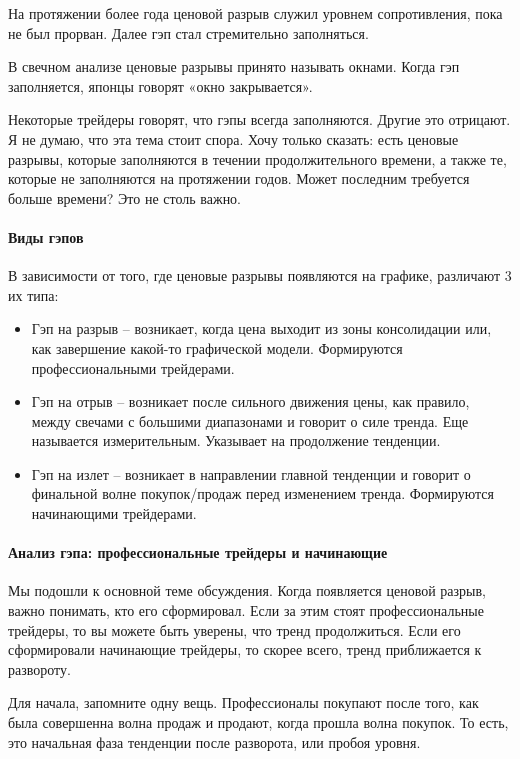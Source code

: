 \documentclass{book}
\begin{document}
На протяжении более года ценовой разрыв служил уровнем сопротивления, пока не был прорван. Далее гэп стал стремительно заполняться.

В свечном анализе ценовые разрывы принято называть окнами. Когда гэп заполняется, японцы говорят «окно закрывается».

Некоторые трейдеры говорят, что гэпы всегда заполняются. Другие это
отрицают. Я не думаю, что эта тема стоит спора. Хочу только сказать:
есть ценовые разрывы, которые заполняются в течении продолжительного
времени, а также те, которые не заполняются на протяжении годов. Может
последним требуется больше времени? Это не столь важно.

\paragraph{Виды гэпов}

В зависимости от того, где ценовые разрывы появляются на графике, различают 3 их типа:
\begin{itemize}
\item     Гэп на разрыв – возникает, когда цена выходит из зоны консолидации или, как завершение какой-то графической модели. Формируются профессиональными трейдерами.
\item     Гэп на отрыв – возникает после сильного движения цены, как правило, между свечами с большими диапазонами и говорит о силе тренда. Еще называется измерительным. Указывает на продолжение тенденции.
\item     Гэп на излет – возникает в направлении главной тенденции и
  говорит о финальной волне покупок/продаж перед изменением
  тренда. Формируются начинающими трейдерами.
\end{itemize}

\paragraph{Анализ гэпа: профессиональные трейдеры и начинающие}

Мы подошли к основной теме обсуждения. Когда появляется ценовой разрыв, важно понимать, кто его сформировал. Если за этим стоят профессиональные трейдеры, то вы можете быть уверены, что тренд продолжиться. Если его сформировали начинающие трейдеры, то скорее всего, тренд приближается к развороту.

Для начала, запомните одну вещь. Профессионалы покупают после того, как была совершенна волна продаж и продают, когда прошла волна покупок. То есть, это начальная фаза тенденции после разворота, или пробоя уровня.
\end{document}
